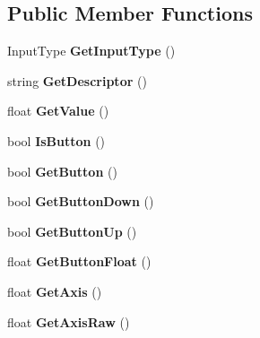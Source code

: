 \subsection*{Public Member Functions}
\begin{DoxyCompactItemize}
\item 
\hypertarget{class_input_config_a5aeb06d46b4ce797aa50e5028d9f27fc}{Input\-Type {\bfseries Get\-Input\-Type} ()}\label{class_input_config_a5aeb06d46b4ce797aa50e5028d9f27fc}

\item 
\hypertarget{class_input_config_aac8fb999cdab8a24c0000186286f248e}{string {\bfseries Get\-Descriptor} ()}\label{class_input_config_aac8fb999cdab8a24c0000186286f248e}

\item 
\hypertarget{class_input_config_ab2abc882cc6352e3b352bcf79e889bf2}{float {\bfseries Get\-Value} ()}\label{class_input_config_ab2abc882cc6352e3b352bcf79e889bf2}

\item 
\hypertarget{class_input_config_a5cb0971c65ce8b3fe8b17c3ea233b119}{bool {\bfseries Is\-Button} ()}\label{class_input_config_a5cb0971c65ce8b3fe8b17c3ea233b119}

\item 
\hypertarget{class_input_config_a007664c153ac336901c9a826c13bcb7c}{bool {\bfseries Get\-Button} ()}\label{class_input_config_a007664c153ac336901c9a826c13bcb7c}

\item 
\hypertarget{class_input_config_afd364920358f4087dbbd1d3fbd40a8b3}{bool {\bfseries Get\-Button\-Down} ()}\label{class_input_config_afd364920358f4087dbbd1d3fbd40a8b3}

\item 
\hypertarget{class_input_config_aec8c6e010b44f739f9eec84611ec558c}{bool {\bfseries Get\-Button\-Up} ()}\label{class_input_config_aec8c6e010b44f739f9eec84611ec558c}

\item 
\hypertarget{class_input_config_adeb967cf84a4760e139e9d08f152b1df}{float {\bfseries Get\-Button\-Float} ()}\label{class_input_config_adeb967cf84a4760e139e9d08f152b1df}

\item 
\hypertarget{class_input_config_ac300f9725530f733181a935688909774}{float {\bfseries Get\-Axis} ()}\label{class_input_config_ac300f9725530f733181a935688909774}

\item 
\hypertarget{class_input_config_a9cbe24ce700bcb4ebe316a949bd0590a}{float {\bfseries Get\-Axis\-Raw} ()}\label{class_input_config_a9cbe24ce700bcb4ebe316a949bd0590a}

\end{DoxyCompactItemize}
